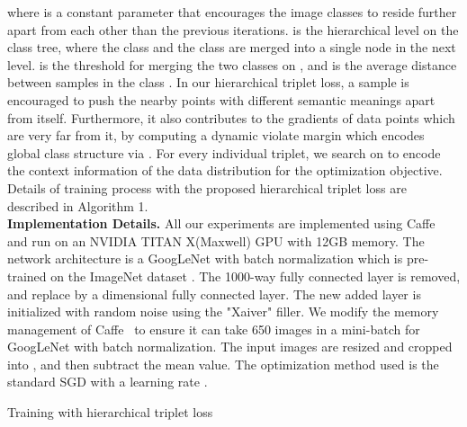 \documentclass[runningheads]{llncs}
\begin{document}
where  is a constant parameter that encourages the image classes to reside further apart from each other than the previous iterations.  is the hierarchical level on the class tree, where the class  and the class  are merged into a single node in the next level.  is the threshold for merging the two classes on , and  is the average distance between samples in the class . In our hierarchical triplet loss, a sample  is encouraged to push the nearby points with different semantic meanings apart from itself. Furthermore, it also contributes to the gradients of data points which are very far from it, by computing a dynamic violate margin which encodes global class structure via . For every individual triplet, we search on  to encode the context information of the data distribution for the optimization objective. Details of training process with the proposed hierarchical triplet loss are described in Algorithm 1.\\

\noindent\textbf{Implementation Details.}
All our experiments are implemented using Caffe~\cite{jia2014caffe} and run on an NVIDIA TITAN X(Maxwell) GPU with 12GB memory. The network architecture is a GoogLeNet \cite{szegedy2015going} with batch normalization \cite{ioffe2015batch} which is pre-trained on the ImageNet dataset \cite{ILSVRC15}. The 1000-way fully connected layer is removed, and replace by a  dimensional fully connected layer. The new added layer is initialized with random noise using the "Xaiver" filler.  We modify the memory management of Caffe~\cite{jia2014caffe} to ensure it can take 650 images in a mini-batch for GoogLeNet with batch normalization. The input images are resized and cropped into , and then subtract the mean value. The optimization method used is the standard SGD with a learning rate .

\begin{algorithm}[H]
\caption{Training with hierarchical triplet loss}\LinesNumbered {}

\end{algorithm}
\end{document}
